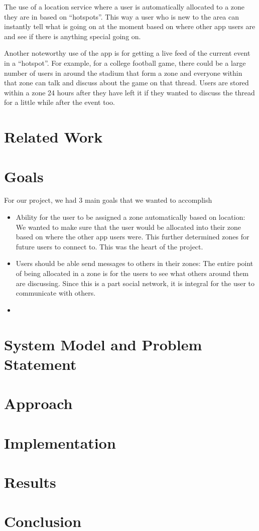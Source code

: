 \documentclass[11pt, journal]{IEEEtran}
\begin{document}
		The use of a location service where a user is automatically allocated to a zone they are in based on ``hotspots''. This way a user who is new to the area can instantly tell what is going on at the moment based on where other app users are and see if there is anything special going on.

		Another noteworthy use of the app is for getting a live feed of the current event in a ``hotspot''. For example, for a college football game, there could be a large number of users in around the stadium that form a zone and everyone within that zone can talk and discuss about the game on that thread. Users are stored within a zone 24 hours after they have left it if they wanted to discuss the thread for a little while after the event too.

\section{Related Work}


\section{Goals}
	For our project, we had 3 main goals that we wanted to accomplish
	\begin{itemize}
		\item Ability for the user to be assigned a zone automatically based on location: We wanted to make sure that the user would be allocated into their zone based on where the other app users were. This further determined zones for future users to connect to. This was the heart of the project.
		\item Users should be able send messages to others in their zones: The entire point of being allocated in a zone is for the users to see what others around them are discussing. Since this is a part social network, it is integral for the user to communicate with others.
		\item 
	\end{itemize}

\section{System Model and Problem Statement}


\section{Approach}


\section{Implementation}


\section{Results}


\section{Conclusion}

\end{document}
